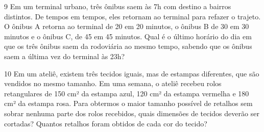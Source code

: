 \num{9} Em um terminal urbano, três ônibus saem às 7h com destino a bairros
distintos. De tempos em tempos, eles retornam ao terminal para refazer o
trajeto. O ônibus A retorna ao terminal de 20 em 20 minutos, o ônibus B
de 30 em 30 minutos e o ônibus C, de 45 em 45 minutos. Qual é o último
horário do dia em que os três ônibus saem da rodoviária ao mesmo tempo,
sabendo que os ônibus saem a última vez do terminal às 23h?



\num{10} Em um ateliê, existem três tecidos iguais, mas de estampas
diferentes, que são vendidos no mesmo tamanho. Em uma semana, o ateliê
recebeu rolos retangulares de 150 cm² da estampa azul, 120 cm² da
estampa vermelha e 180 cm² da estampa rosa. Para obtermos o maior
tamanho possível de retalhos sem sobrar nenhuma parte dos rolos
recebidos, quais dimensões de tecidos deverão ser cortadas? Quantos
retalhos foram obtidos de cada cor do tecido?

